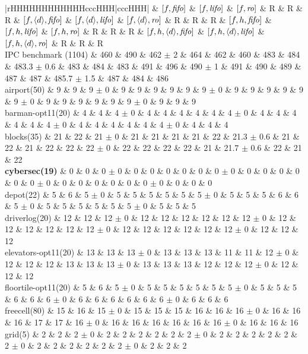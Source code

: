 \begin{center}
\begin{tabular}{|rHHHHHHHHHHHHcccHHH|cccHHH|}
\hline
 & \([f,{\text{\textit{fifo}}}]\) & \([f,{\text{\textit{lifo}}}]\) & \([f,{\text{\textit{ro}}}]\) & R & R & R & \([f,{\left<d\right>},{\text{\textit{fifo}}}]\) & \([f,{\left<d\right>},{\text{\textit{lifo}}}]\) & \([f,{\left<d\right>},{\text{\textit{ro}}}]\) & R & R & R & \([f,h,{\text{\textit{fifo}}}]\) & \([f,h,{\text{\textit{lifo}}}]\) & \([f,h,{\text{\textit{ro}}}]\) & R & R & R & \([f,h,{\left<d\right>},{\text{\textit{fifo}}}]\) & \([f,h,{\left<d\right>},{\text{\textit{lifo}}}]\) & \([f,h,{\left<d\right>},{\text{\textit{ro}}}]\) & R & R & R\\
\hline
IPC benchmark (1104) & 460 & 490 & 462 \(\pm\) 2 & 464 & 462 & 460 & 483 & 484 & 483.3 \(\pm\) 0.6 & 483 & 484 & 483 & 491 & 496 & 490 \(\pm\) 1 & 491 & 490 & 489 & 487 & 487 & 485.7 \(\pm\) 1.5 & 487 & 484 & 486\\
\hline
airport(50) & 9 & 9 & 9 \(\pm\) 0 & 9 & 9 & 9 & 9 & 9 & 9 \(\pm\) 0 & 9 & 9 & 9 & 9 & 9 & 9 \(\pm\) 0 & 9 & 9 & 9 & 9 & 9 & 9 \(\pm\) 0 & 9 & 9 & 9\\
barman-opt11(20) & 4 & 4 & 4 \(\pm\) 0 & 4 & 4 & 4 & 4 & 4 & 4 \(\pm\) 0 & 4 & 4 & 4 & 4 & 4 & 4 \(\pm\) 0 & 4 & 4 & 4 & 4 & 4 & 4 \(\pm\) 0 & 4 & 4 & 4\\
blocks(35) & 21 & 22 & 21 \(\pm\) 0 & 21 & 21 & 21 & 21 & 22 & 21.3 \(\pm\) 0.6 & 21 & 22 & 21 & 22 & 22 & 22 \(\pm\) 0 & 22 & 22 & 22 & 22 & 21 & 21.7 \(\pm\) 0.6 & 22 & 21 & 22\\
\textbf{cybersec(19)} & 0 & 0 & 0 \(\pm\) 0 & 0 & 0 & 0 & 0 & 0 & 0 \(\pm\) 0 & 0 & 0 & 0 & 0 & 0 & 0 \(\pm\) 0 & 0 & 0 & 0 & 0 & 0 & 0 \(\pm\) 0 & 0 & 0 & 0\\
depot(22) & 5 & 6 & 5 \(\pm\) 0 & 5 & 5 & 5 & 5 & 5 & 5 \(\pm\) 0 & 5 & 5 & 5 & 6 & 6 & 5 \(\pm\) 0 & 5 & 5 & 5 & 5 & 5 & 5 \(\pm\) 0 & 5 & 5 & 5\\
driverlog(20) & 12 & 12 & 12 \(\pm\) 0 & 12 & 12 & 12 & 12 & 12 & 12 \(\pm\) 0 & 12 & 12 & 12 & 12 & 12 & 12 \(\pm\) 0 & 12 & 12 & 12 & 12 & 12 & 12 \(\pm\) 0 & 12 & 12 & 12\\
elevators-opt11(20) & 13 & 13 & 13 \(\pm\) 0 & 13 & 13 & 13 & 11 & 11 & 12 \(\pm\) 0 & 12 & 12 & 12 & 13 & 13 & 13 \(\pm\) 0 & 13 & 13 & 13 & 12 & 12 & 12 \(\pm\) 0 & 12 & 12 & 12\\
floortile-opt11(20) & 5 & 6 & 5 \(\pm\) 0 & 5 & 5 & 5 & 5 & 5 & 5 \(\pm\) 0 & 5 & 5 & 5 & 6 & 6 & 6 \(\pm\) 0 & 6 & 6 & 6 & 6 & 6 & 6 \(\pm\) 0 & 6 & 6 & 6\\
freecell(80) & 15 & 16 & 15 \(\pm\) 0 & 15 & 15 & 15 & 16 & 16 & 16 \(\pm\) 0 & 16 & 16 & 16 & 17 & 17 & 16 \(\pm\) 0 & 16 & 16 & 16 & 16 & 16 & 16 \(\pm\) 0 & 16 & 16 & 16\\
grid(5) & 2 & 2 & 2 \(\pm\) 0 & 2 & 2 & 2 & 2 & 2 & 2 \(\pm\) 0 & 2 & 2 & 2 & 2 & 2 & 2 \(\pm\) 0 & 2 & 2 & 2 & 2 & 2 & 2 \(\pm\) 0 & 2 & 2 & 2\\

\end{tabular}
\end{center}
